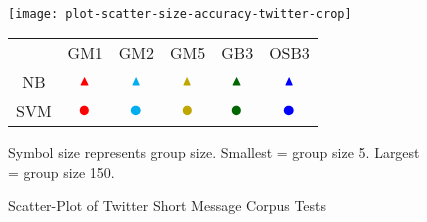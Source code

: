 	
				
\paragraph*{}
	\begin{sidewaysfigure}[htbp!]
		\begin{center}
		\centering
		\texttt{[image: plot-scatter-size-accuracy-twitter-crop]}

		\begin{tabular}{cccccc}
			
			  	& GM1	& GM2	& GM5	& GB3	& OSB3	\\
			NB	& $ \color{red} \blacktriangle$ & $\color{cyan} \blacktriangle$ & $\color{MyDarkYellow} \blacktriangle$ & $\color{MyOliveGreen} \blacktriangle$ & $\color{blue} \blacktriangle$ \\ 					
			SVM	& $ \color{red} \CIRCLE$ & $\color{cyan} \CIRCLE$ & $\color{MyDarkYellow} \CIRCLE$ & $\color{MyOliveGreen} \CIRCLE$ & $\color{blue} \CIRCLE$ \\	
			
		\end{tabular}
		\begin{comment}	
		\begin{tabular}{ccc}
			& NB 					& SVM 					\\
		GM1 	& $\color{red} \blacktriangle$		& $\color{red} \CIRCLE$			\\
		GM2 	& $\color{cyan} \blacktriangle$		& $\color{cyan} \CIRCLE$		\\
		GM5 	& $\color{MyDarkYellow} \blacktriangle$	& $\color{MyDarkYellow} \CIRCLE$	\\
		GB3 	& $\color{MyOliveGreen} \blacktriangle$	& $\color{MyOliveGreen} \CIRCLE$	\\
		OSB3 	& $\color{red} \blacktriangle$		& $\color{red} \CIRCLE$			\\
		\end{tabular}
		
		\end{comment}
		\begin{singlespace}
		Symbol size represents group size.  Smallest = group size 5.  Largest = group size 150.  
		\end{singlespace}
		
		\caption{Scatter-Plot of Twitter Short Message Corpus Tests}
		\label{fig:plot-scatter-twitter}
		\end{center}
	\end{sidewaysfigure}

